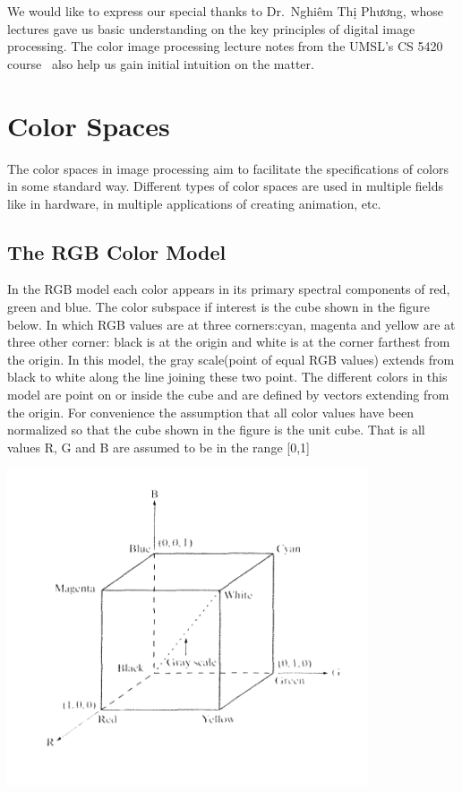 \documentclass[a4paper,12pt]{article}
\begin{document}
We would like to express our special thanks to Dr.~Nghiêm Thị Phương,
whose lectures gave us basic understanding on the key principles of
digital image processing.  The color image processing lecture notes from
the UMSL's CS 5420 course~\cite{cs5420} also help us gain initial intuition
on the matter.

\newpage
{}
\section{Color Spaces}
The color spaces in image processing aim to facilitate the specifications of
colors in some standard way.  Different types of color spaces are used in
multiple fields like in hardware, in multiple applications of creating
animation, etc.

\subsection{The RGB Color Model}
In the RGB model each color appears in its primary spectral components of red,
green and blue. The color subspace if interest is the cube shown in the figure
below. In which RGB values are at three corners:cyan, magenta and yellow are at
three other corner: black is at the origin and white is at the corner farthest
from the origin. In this model, the gray scale(point of equal RGB values)
extends from black to white along the line joining these two point.  The
different colors in this model are point on or inside the cube and are defined
by vectors extending from the origin. For convenience the assumption that all
color values have been normalized so that the cube shown in the figure is the
unit cube. That is all values R, G and B are assumed to be in the range [0,1]
\begin{center}
  \includegraphics[width=0.80\textwidth]{rgb.png}
\end{center}
\end{document}
